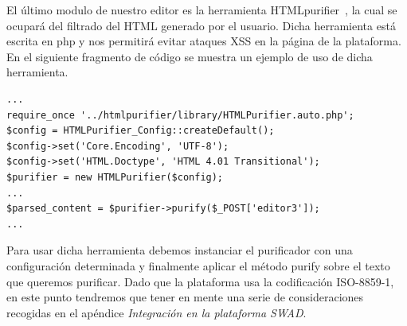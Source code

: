 El último modulo de nuestro editor es la herramienta HTMLpurifier~\cite{htmlpurifier}, la cual se ocupará del filtrado del HTML generado por el usuario. Dicha herramienta está escrita en php y nos permitirá evitar ataques XSS en la página de la plataforma. En el siguiente fragmento de código se muestra un ejemplo de uso de dicha herramienta.

\begin{verbatim}
...
require_once '../htmlpurifier/library/HTMLPurifier.auto.php';
$config = HTMLPurifier_Config::createDefault();
$config->set('Core.Encoding', 'UTF-8'); 
$config->set('HTML.Doctype', 'HTML 4.01 Transitional'); 
$purifier = new HTMLPurifier($config);
...
$parsed_content = $purifier->purify($_POST['editor3']);
...
\end{verbatim}

Para usar dicha herramienta debemos instanciar el purificador con una configuración determinada y finalmente aplicar el método purify sobre el texto que queremos purificar. Dado que la plataforma usa la codificación ISO-8859-1, en este punto tendremos que tener en mente una serie de consideraciones recogidas en el apéndice \emph{Integración en la plataforma SWAD}.

